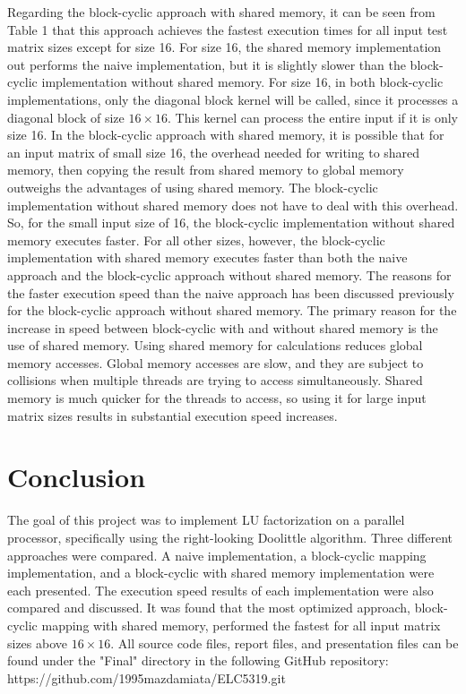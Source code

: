 \documentclass{article}
\begin{document}
Regarding the block-cyclic approach with shared memory, it can be seen from Table 1 that this approach achieves the fastest execution times for all input test matrix sizes except for size 16. For size 16, the shared memory implementation out performs the naive implementation, but it is slightly slower than the block-cyclic implementation without shared memory. For size 16, in both block-cyclic implementations, only the diagonal block kernel will be called, since it processes a diagonal block of size $16\times 16$. This kernel can process the entire input if it is only size 16. In the block-cyclic approach with shared memory, it is possible that for an input matrix of small size 16, the overhead needed for writing to shared memory, then copying the result from shared memory to global memory outweighs the advantages of using shared memory. The block-cyclic implementation without shared memory does not have to deal with this overhead. So, for the small input size of 16, the block-cyclic implementation without shared memory executes faster. For all other sizes, however, the block-cyclic implementation with shared memory executes faster than both the naive approach and the block-cyclic approach without shared memory. The reasons for the faster execution speed than the naive approach has been discussed previously for the block-cyclic approach without shared memory. The primary reason for the increase in speed between block-cyclic with and without shared memory is the use of shared memory. Using shared memory for calculations reduces global memory accesses. Global memory accesses are slow, and they are subject to collisions when multiple threads are trying to access simultaneously. Shared memory is much quicker for the threads to access, so using it for large input matrix sizes results in substantial execution speed increases.

\section{Conclusion}
The goal of this project was to implement LU factorization on a parallel processor, specifically using the right-looking Doolittle algorithm. Three different approaches were compared. A naive implementation, a block-cyclic mapping implementation, and a block-cyclic with shared memory implementation were each presented. The execution speed results of each implementation were also compared and discussed. It was found that the most optimized approach, block-cyclic mapping with shared memory, performed the fastest for all input matrix sizes above $16\times 16$. All source code files, report files, and presentation files can be found under the "Final" directory in the following GitHub repository: https://github.com/1995mazdamiata/ELC5319.git
\end{document}
